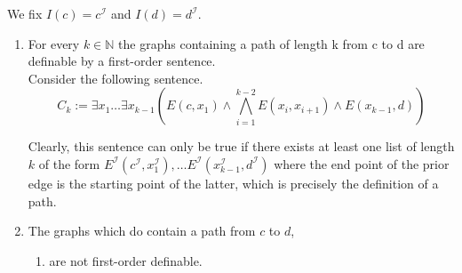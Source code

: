\documentclass[11pt,a4paper]{article}
\begin{document}
We fix $I(c)=c^{\mathcal{I}}$ and $I(d)=d^{\mathcal{I}}$. 

\begin{enumerate}
\item  For every $k \in \mathbb{N}$ the graphs containing a path of length k from c to d are definable by a
first-order sentence. \\

Consider the following sentence.
\begin{equation*}
C_k := \exists x_1  \dots \exists x_{k-1} \left(  E(c,x_1) \land \bigwedge_{i=1}^{k-2} E(x_i, x_{i+1}) \land E(x_{k-1}, d) \right) 
\end{equation*}

Clearly, this sentence can only be true if there exists at least one list of length $k$ of the form $E^{\mathcal{I}}(c^{\mathcal{I}},x^{\mathcal{I}}_1), \dots E^{\mathcal{I}}(x^{\mathcal{I}}_{k-1},d^{\mathcal{I}})$ where the end point of the prior edge is the starting point of the latter, which is precisely the definition of a path.

\item The graphs which do contain a path from $c$ to $d$,
\begin{enumerate}
\item are not first-order definable. \\


\end{enumerate}
\end{enumerate}
\end{document}
